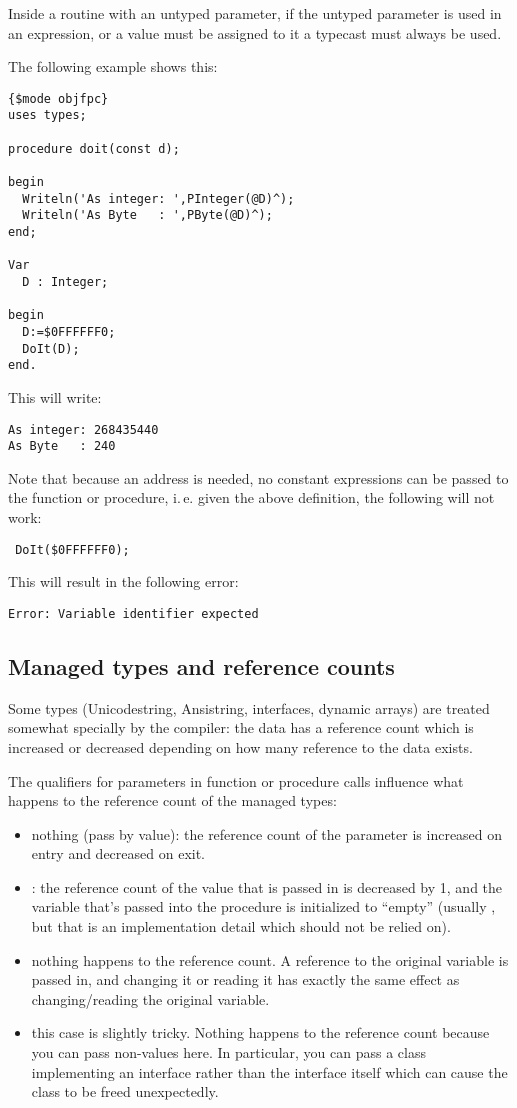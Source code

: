 Inside a routine with an untyped parameter, if the untyped parameter is used in an 
expression, or a value must be assigned to it a typecast must always be used. 

The following example shows this:
\begin{verbatim}
{$mode objfpc}
uses types;

procedure doit(const d);

begin
  Writeln('As integer: ',PInteger(@D)^);
  Writeln('As Byte   : ',PByte(@D)^);
end;

Var
  D : Integer;

begin
  D:=$0FFFFFF0;
  DoIt(D);
end.
\end{verbatim}
This will write:
\begin{verbatim}
As integer: 268435440
As Byte   : 240
\end{verbatim}

Note that because an address is needed, no constant expressions can be
passed to the function or procedure, i.\,e. given the above definition, 
the following will not work:
\begin{verbatim}
 DoIt($0FFFFFF0);
\end{verbatim}
This will result in the following error:
\begin{verbatim}
Error: Variable identifier expected
\end{verbatim}



\subsection{Managed types and reference counts}
Some types (Unicodestring, Ansistring, interfaces, dynamic arrays) are
treated somewhat specially by the compiler: the data has a reference count
which is increased or decreased depending on how many reference to the data
exists.

The qualifiers for parameters in function or procedure calls influence
what happens to the reference count of the managed types:
\begin{itemize}
\item nothing (pass by value): the reference count of the parameter is increased
on entry and decreased on exit.
\item {}: the reference count of the value that is passed in is decreased by 1,
 and the variable that's passed into the procedure is initialized to ``empty''
(usually , but that is an implementation detail which should not
be relied on).
\item {} nothing happens to the reference count. A reference to the original
 variable is passed in, and changing it or reading it has exactly the same effect as changing/reading the original variable.
\item {} this case is slightly tricky. Nothing happens to the reference
count because you can pass non-values here.
In particular, you can pass a class implementing an interface rather than the interface itself
which can cause the class to be freed unexpectedly.
\end{itemize}

